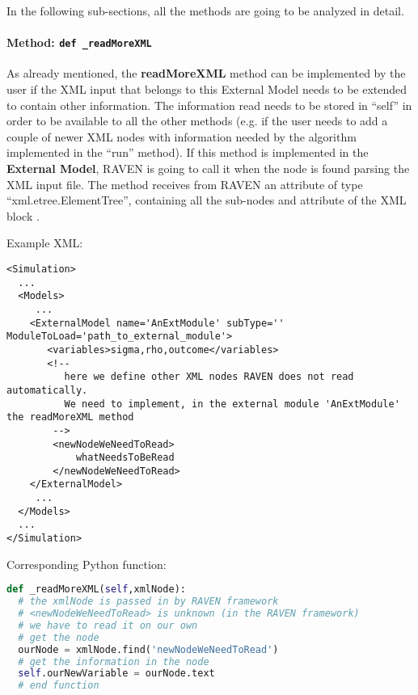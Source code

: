 In the following sub-sections, all the methods are going to be analyzed in
detail.

\paragraph{Method: \texttt{def \_readMoreXML}}
\label{subsubsubsec:externalReadMoreXML}
As already mentioned, the \textbf{readMoreXML} method can be implemented by the
user if the XML input that belongs to this External Model needs to be extended
to contain other information.
%
The information read needs to be stored in ``self'' in order to be available to
all the other methods (e.g. if the user needs to add a couple of newer XML nodes
with information needed by the algorithm implemented in the ``run'' method).
%
If this method is implemented in the \textbf{External Model}, RAVEN is going to
call it when the node  is found parsing the XML input
file.
%
The method receives from RAVEN an attribute of type ``xml.etree.ElementTree'',
containing all the sub-nodes and attribute of the XML block .
%

Example XML:
\begin{lstlisting}[style=XML,morekeywords={subType,ModuleToLoad}]
<Simulation>
  ...
  <Models>
     ...
    <ExternalModel name='AnExtModule' subType='' ModuleToLoad='path_to_external_module'>
       <variables>sigma,rho,outcome</variables>
       <!--
          here we define other XML nodes RAVEN does not read automatically.
          We need to implement, in the external module 'AnExtModule' the readMoreXML method
        -->
        <newNodeWeNeedToRead>
            whatNeedsToBeRead
        </newNodeWeNeedToRead>
    </ExternalModel>
     ...
  </Models>
  ...
</Simulation>
\end{lstlisting}

Corresponding Python function:
\begin{lstlisting}[language=python]
def _readMoreXML(self,xmlNode):
  # the xmlNode is passed in by RAVEN framework
  # <newNodeWeNeedToRead> is unknown (in the RAVEN framework)
  # we have to read it on our own
  # get the node
  ourNode = xmlNode.find('newNodeWeNeedToRead')
  # get the information in the node
  self.ourNewVariable = ourNode.text
  # end function
\end{lstlisting}


